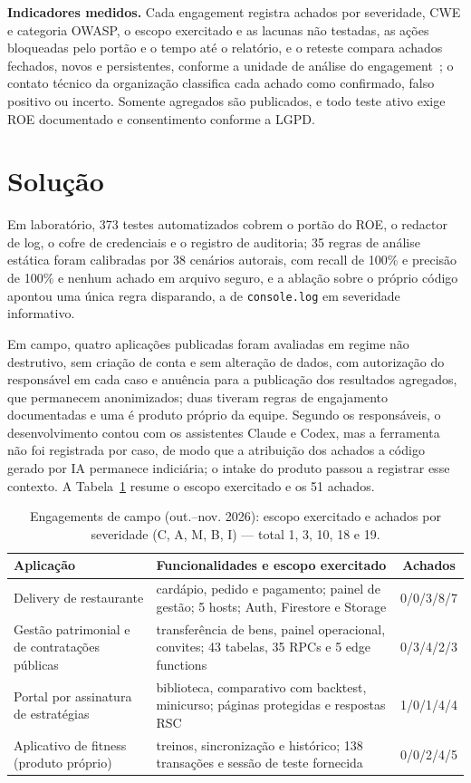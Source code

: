 \documentclass[12pt]{article}
\begin{document}
\textbf{Indicadores medidos.} Cada engagement registra achados por severidade, CWE e categoria
OWASP, o escopo exercitado e as lacunas não testadas, as ações bloqueadas pelo portão e o tempo
até o relatório, e o reteste compara achados fechados, novos e persistentes, conforme a unidade
de análise do engagement~\cite{runeson2009guidelines}; o contato técnico da organização
classifica cada achado como confirmado, falso positivo ou incerto. Somente agregados são
publicados, e todo teste ativo exige ROE documentado e consentimento conforme a LGPD.

\section{Solução}

Em laboratório, 373 testes automatizados cobrem o portão do ROE, o redactor de log, o cofre de
credenciais e o registro de auditoria; 35 regras de análise estática foram calibradas por 38
cenários autorais, com recall de 100\% e precisão de 100\% e nenhum achado em arquivo seguro, e
a ablação sobre o próprio código apontou uma única regra disparando, a de
\texttt{console.log} em severidade informativo.

Em campo, quatro aplicações publicadas foram avaliadas em regime não destrutivo, sem criação de
conta e sem alteração de dados, com autorização do responsável em cada caso e anuência para a
publicação dos resultados agregados, que permanecem anonimizados; duas tiveram regras de
engajamento documentadas e uma é produto próprio da equipe. Segundo os responsáveis,
o desenvolvimento contou com os assistentes Claude e Codex, mas a ferramenta não foi registrada
por caso, de modo que a atribuição dos achados a código gerado por IA permanece indiciária; o
intake do produto passou a registrar esse contexto. A Tabela~\ref{tab:casos}
resume o escopo exercitado e os 51 achados.

\begin{table}[t]
\centering
\caption{Engagements de campo (out.–nov. 2026): escopo exercitado e achados por severidade (C, A, M, B, I) — total 1, 3, 10, 18 e 19.}
\label{tab:casos}
\scriptsize
\begin{tabularx}{\textwidth}{@{}p{3.3cm}Xc@{}}
\toprule
\textbf{Aplicação} & \textbf{Funcionalidades e escopo exercitado} & \textbf{Achados} \\
\midrule
Delivery de restaurante & cardápio, pedido e pagamento; painel de gestão; 5 hosts; Auth, Firestore e Storage & 0/0/3/8/7 \\
Gestão patrimonial e de contratações públicas & transferência de bens, painel operacional, convites; 43 tabelas, 35 RPCs e 5 edge functions & 0/3/4/2/3 \\
Portal por assinatura de estratégias & biblioteca, comparativo com backtest, minicurso; páginas protegidas e respostas RSC & 1/0/1/4/4 \\
Aplicativo de fitness (produto próprio) & treinos, sincronização e histórico; 138 transações e sessão de teste fornecida & 0/0/2/4/5 \\
\bottomrule
\end{tabularx}
\end{table}
\end{document}
